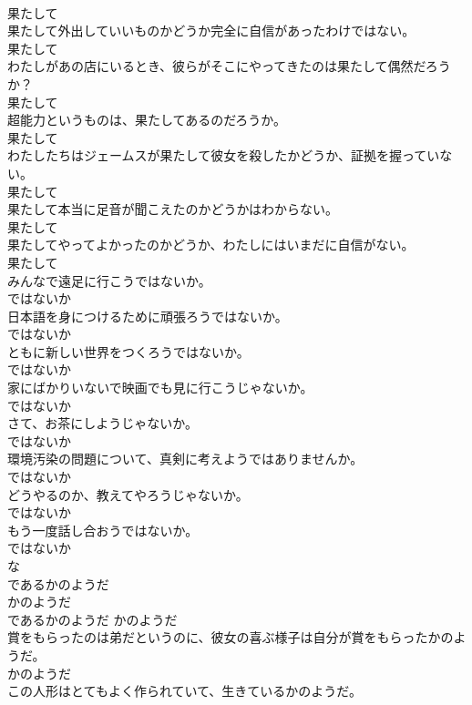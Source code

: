 \documentclass[8pt]{extreport}
\begin{document}
\begin{CJK}{UTF8}{min}
\\	果たして
\\	果たして外出していいものかどうか完全に自信があったわけではない。	
\\	果たして
\\	わたしがあの店にいるとき、彼らがそこにやってきたのは果たして偶然だろうか？	
\\	果たして
\\	超能力というものは、果たしてあるのだろうか。	
\\	果たして
\\	わたしたちはジェームスが果たして彼女を殺したかどうか、証拠を握っていない。	
\\	果たして
\\	果たして本当に足音が聞こえたのかどうかはわからない。	
\\	果たして
\\	果たしてやってよかったのかどうか、わたしにはいまだに自信がない。	
\\	果たして
\\	みんなで遠足に行こうではないか。	
\\	ではないか
\\	日本語を身につけるために頑張ろうではないか。	
\\	ではないか
\\	ともに新しい世界をつくろうではないか。	
\\	ではないか
\\	家にばかりいないで映画でも見に行こうじゃないか。	
\\	ではないか
\\	さて、お茶にしようじゃないか。	
\\	ではないか
\\	環境汚染の問題について、真剣に考えようではありませんか。	
\\	ではないか
\\	どうやるのか、教えてやろうじゃないか。	
\\	ではないか
\\	もう一度話し合おうではないか。	
\\	ではないか
\\	な
\\	であるかのようだ	
\\	かのようだ	
\\	であるかのようだ	かのようだ
\\	賞をもらったのは弟だというのに、彼女の喜ぶ様子は自分が賞をもらったかのようだ。	
\\	かのようだ
\\	この人形はとてもよく作られていて、生きているかのようだ。	

\end{CJK}
\end{document}
